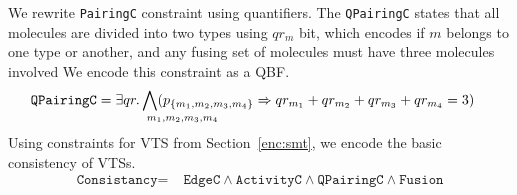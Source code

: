 We rewrite \texttt{PairingC} constraint using quantifiers.
%
The \texttt{QPairingC} states that all molecules are divided into two types
using $qr_m$ bit, which encodes if $m$ belongs to one type or another,
and any fusing set of molecules must have three molecules involved
%
We encode this constraint as a QBF.
\begin{align*}
 \texttt{QPairingC} =\;&
\exists qr. \Land\limits_{\mathrlap{m_1,m_2,m_3,m_4}\;\;}
(p_{\{m_1,m_2,m_3,m_4\}} \limplies qr_{m_1} + qr_{m_2} + qr_{m_3} + qr_{m_4} = 3)
\end{align*}
Using constraints for VTS from Section~\ref{enc:smt}, we encode the basic consistency of VTSs. 
%
\begin{align*}
\texttt{Consistancy} =\;& \texttt{EdgeC} \land
\texttt{ActivityC} \land \texttt{QPairingC} \land
\texttt{Fusion} 
\end{align*}
